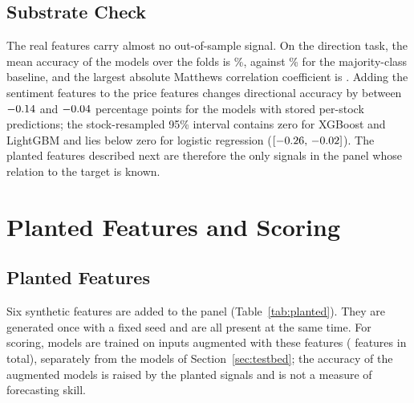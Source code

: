 \documentclass[conference]{IEEEtran}
\begin{document}
\subsection{Substrate Check}
The real features carry almost no out-of-sample signal. On the direction
task, the mean accuracy of the \nModelsZoo{} models over the \nFolds{} folds
is \modelZooMeanAccPct\%, against \majAcc\% for the majority-class baseline,
and the largest absolute Matthews correlation coefficient is
\modelZooMaxMCC. Adding the sentiment features to the price features changes
directional accuracy by between $-0.14$ and $-0.04$
percentage points for the \nSentModels{} models with stored per-stock
predictions; the stock-resampled 95\% interval contains zero for XGBoost and
LightGBM and lies below zero for logistic regression
($[-0.26,\,-0.02]$). The planted features described
next are therefore the only signals in the panel whose relation to the
target is known.

\section{Planted Features and Scoring}
\label{sec:planted}
\subsection{Planted Features}
Six synthetic features are added to the panel (Table~\ref{tab:planted}).
They are generated once with a fixed seed and are all present at the same
time. For scoring, models are trained on inputs augmented with these
features (\nFeatTotal{} features in total), separately from the models of
Section~\ref{sec:testbed}; the accuracy of the augmented models is raised by
the planted signals and is not a measure of forecasting skill.
\end{document}
